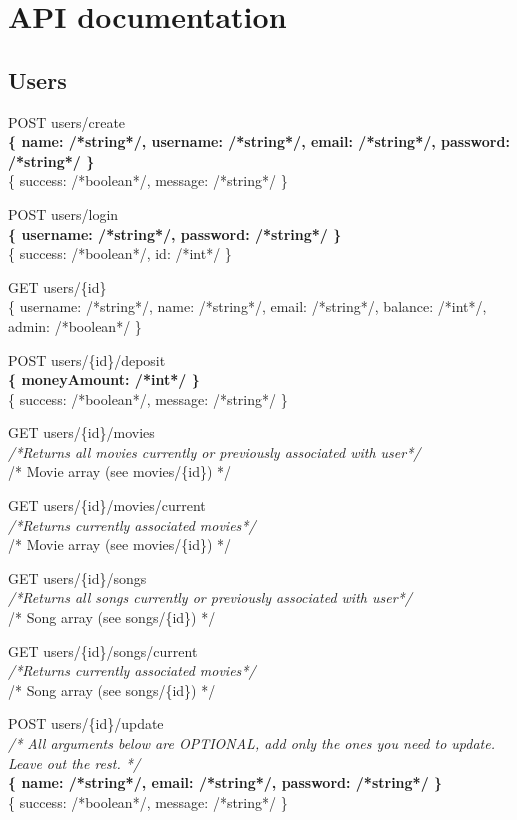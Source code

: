 \section{API documentation}
\label{app:apidoc}

\subsection{Users}

POST users/create\\
\textbf{\{ name: /*string*/, username: /*string*/, email: /*string*/, password: /*string*/ \}}\\
\{ success: /*boolean*/, message: /*string*/ \}

POST users/login\\
\textbf{\{ username: /*string*/, password: /*string*/ \}}\\
\{ success: /*boolean*/, id: /*int*/ \}

GET  users/\{id\}\\
\{ username: /*string*/, name: /*string*/, email: /*string*/, balance: /*int*/, admin: /*boolean*/ \}

POST users/\{id\}/deposit\\
\textbf{\{ moneyAmount: /*int*/ \}}\\
\{ success: /*boolean*/, message: /*string*/ \}

GET  users/\{id\}/movies\\
\emph{/*Returns all movies currently or previously associated with user*/}\\
/* Movie array (see movies/\{id\}) */

GET  users/\{id\}/movies/current\\
\emph{/*Returns currently associated movies*/}\\
/* Movie array (see movies/\{id\}) */

GET  users/\{id\}/songs\\
\emph{/*Returns all songs currently or previously associated with user*/}\\
/* Song array (see songs/\{id\}) */

GET  users/\{id\}/songs/current\\
\emph{/*Returns currently associated movies*/}\\
/* Song array (see songs/\{id\}) */

POST users/\{id\}/update\\
\emph{/* All arguments below are OPTIONAL, add only the ones you need to update. Leave out the rest. */} \\
\textbf{\{ name: /*string*/, email: /*string*/, password: /*string*/ \}\\}
\{ success: /*boolean*/, message: /*string*/ \}

